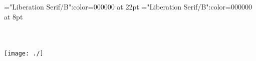 \documentclass[a4paper,twoside]{article}
\begin{document}
\thispagestyle{empty} 
\font\CoverPageTitle="Liberation Serif/B":color=000000 at 22pt 
\font\pFrontMatterdiv="Liberation Serif/B":color=000000 at 8pt 
\vskip 60pt 
\begin{center} 
\end{center} 
\newpage 
\newpage 
\thispagestyle{empty} 
\mbox{} 
\begin{titlepage}
\begin{center}
\textsc{\LARGE {}}\\[1.5cm] 
\vspace{110 mm} 
\textsc{ }\\[0.5cm] 
\texttt{[image: ./]}\\[1cm]    
\end{center} 
\end{titlepage} 
\setcounter{page}{3} 
 
\pagestyle{plain} 
\newpage 
\end{document}

